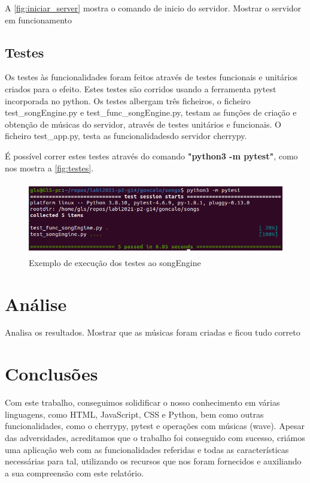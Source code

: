 \documentclass{report}
\begin{document}
A \autoref{fig:iniciar_server} mostra o comando de inicio do servidor.
Mostrar o servidor em funcionamento

\section{Testes}
\label{sec:testes}

Os testes às funcionalidades foram feitos através de testes funcionais e unitários criados para 
o efeito. Estes testes são corridos usando a ferramenta pytest incorporada no python. 
Os testes albergam três ficheiros, o ficheiro test\_songEngine.py e test\_func\_songEngine.py, 
testam as funções de criação e obtenção de músicas do servidor, através de testes unitários e
funcionais. O ficheiro test\_app.py, testa as funcionalidadesdo servidor cherrypy.

É possível correr estes testes através do comando \textbf{"python3 -m pytest"}, como nos mostra 
a \autoref{fig:testes}.

\begin{figure}[ht]
\center 
\includegraphics[height=90pt]{img/pytest.png}
\caption{Exemplo de execução dos testes ao songEngine}
\label{fig:testes}
\end{figure}


\chapter{Análise}
\label{chap.analise}
Analisa os resultados.
Mostrar que as músicas foram criadas e ficou tudo correto

\chapter{Conclusões}
\label{chap.conclusao}
Com este trabalho, conseguimos solidificar o nosso conhecimento em várias linguagens, como HTML, JavaScript, CSS e 
Python, bem como outras funcionalidades, como o cherrypy, pytest e operações com músicas (wave).
Apesar das adversidades, acreditamos que o trabalho foi conseguido com sucesso, criámos uma aplicação 
web com as funcionalidades referidas e todas as características necessárias para tal, utilizando os recursos que 
nos foram fornecidos e auxiliando a sua compreensão com este relatório.
\end{document}
